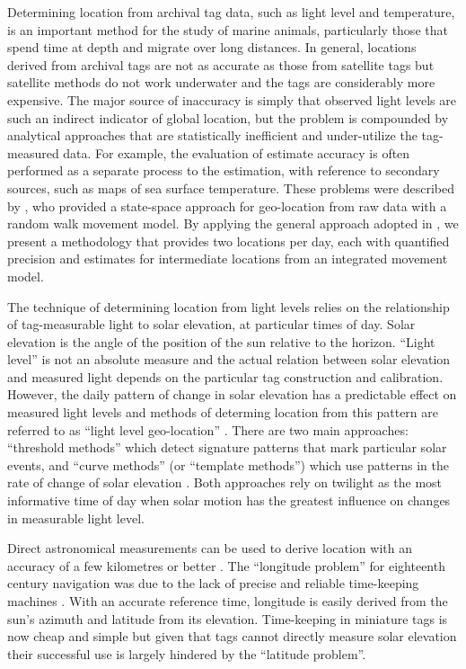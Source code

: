 \documentclass[10pt]{article}
\begin{document}
Determining location from archival tag data, such as light level and
temperature, is an important method for the study of marine animals,
particularly those that spend time at depth and migrate over long
distances.  In general, locations derived from archival tags are not
as accurate as those from satellite tags but satellite methods do not
work underwater and the tags are considerably more expensive. The
major source of inaccuracy is simply that observed light levels are
such an indirect indicator of global location, but the problem is
compounded by analytical approaches that are statistically inefficient
and under-utilize the tag-measured data. For example, the evaluation
of estimate accuracy is often performed as a separate process to the
estimation, with reference to secondary sources, such as maps of sea
surface temperature. These problems were described by
\cite{sibert2007sml}, who provided a state-space approach for
geo-location from raw data with a random walk movement model. By
applying the general approach adopted in \cite{sumner2009}, we
present a methodology that provides two locations per day, each with
quantified precision and estimates for intermediate locations from an
integrated movement model.


The technique of determining location from light levels relies on the
relationship of tag-measurable light to solar elevation, at particular
times of day. Solar elevation is the angle of the position of the sun
relative to the horizon.  ``Light level'' is not an absolute measure
and the actual relation between solar elevation and measured light
depends on the particular tag construction and calibration. However,
the daily pattern of change in solar elevation has a predictable
effect on measured light levels and methods of determing location from
this pattern are referred to as ``light level geo-location''
\cite{H94}.  There are two main approaches: ``threshold methods''
which detect signature patterns that mark particular solar events, and
``curve methods'' (or ``template methods'') which use patterns in the rate of
change of solar elevation
\cite{Welch1999,HB01,MBCG01,Ekstrom,Ekstrom2007}.  Both approaches
rely on twilight as the most informative time of day when solar motion
has the greatest influence on changes in measurable light level.

Direct astronomical measurements can be used to derive location with
an accuracy of a few kilometres or better
\cite{bowditch2002american}. The ``longitude problem'' for eighteenth
century navigation was due to the lack of precise and reliable
time-keeping machines \cite{Lon:S98}. With an accurate reference time,
longitude is easily derived from the sun's azimuth and latitude from
its elevation.  Time-keeping in miniature tags is now cheap and simple
but given that tags cannot directly measure solar elevation their
successful use is largely hindered by the ``latitude problem''. 
\end{document}
